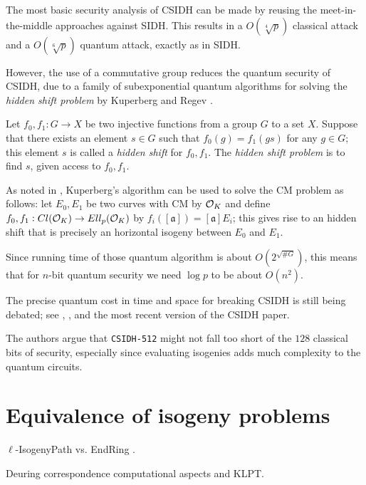 The most basic security analysis of CSIDH can be made by reusing the meet-in-the-middle approaches against SIDH. This results in a $O(\sqrt[4]{p})$ classical attack and a $O(\sqrt[6]{p})$ quantum attack, exactly as in SIDH.

However, the use of a commutative group reduces the quantum security of CSIDH, due to a family of subexponential quantum algorithms for solving the \emph{hidden shift problem} by Kuperberg \cite{Kuperberg2005} and Regev \cite{Regev_hshp}.
\begin{definition}
    Let $f_0,f_1:G\to X$ be two injective functions from a group $G$ to a set $X$. Suppose that there exists an element $s\in G$ such that $f_0(g)=f_1(gs)$ for any $g\in G$; this element $s$ is called a \emph{hidden shift} for $f_0,f_1$. The \emph{hidden shift problem} is to find $s$, given access to $f_0,f_1$.
\end{definition}
As noted in \cite{Childs_hshsp}, Kuperberg's algorithm can be used to solve the CM problem as follows: let $E_0,E_1$ be two curves with CM by $\mathcal{O}_K$ and define $f_0,f_1:Cl(\mathcal{O}_K)\to Ell_p(\mathcal{O}_K)$ by $f_i([\mathfrak{a}]) = [\mathfrak{a}]E_i$; this gives rise to an hidden shift that is precisely an horizontal isogeny between $E_0$ and $E_1$.

Since running time of those quantum algorithm is about $O(2^{\sqrt{\# G}})$, this means that for $n$-bit quantum security we need $\log p$ to be about $O(n^2)$.
    
The precise quantum cost in time and space for breaking CSIDH is still being debated; see \cite{CSIDH_Peikert}, \cite{CSIDH_BS}, \cite{CSIDH_qiso} and the most recent version of the CSIDH paper.

The authors argue that \texttt{CSIDH-512} might not fall too short of the $128$ classical bits of security, especially since evaluating isogenies adds much complexity to the quantum circuits.

\section{Equivalence of isogeny problems}
$\ell$-IsogenyPath vs. EndRing \cite{Weso_EndRing}.

Deuring correspondence computational aspects and KLPT.

\cite{Weso_CSIDH}
